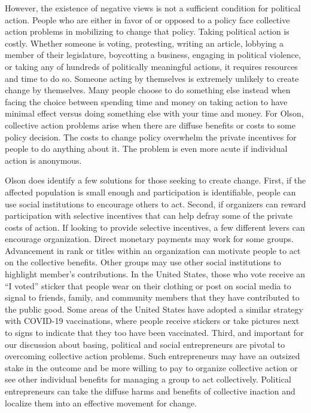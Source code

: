 However, the existence of negative views is not a sufficient condition for political action. People who are either in favor of or opposed to a policy face collective action problems in mobilizing to change that policy.\autocite{Olson1965} Taking political action is costly. Whether someone is voting, protesting, writing an article, lobbying a member of their legislature, boycotting a business, engaging in political violence, or taking any of hundreds of politically meaningful actions, it requires resources and time to do so. Someone acting by themselves is extremely unlikely to create change by themselves. Many people choose to do something else instead when facing the choice between spending time and money on taking action to have minimal effect versus doing something else with your time and money. For Olson, collective action problems arise when there are diffuse benefits or costs to some policy decision. The costs to change policy overwhelm the private incentives for people to do anything about it. The problem is even more acute if individual action is anonymous. 

Olson does identify a few solutions for those seeking to create change. First, if the affected population is small enough and participation is identifiable, people can use social institutions to encourage others to act. Second, if organizers can reward participation with selective incentives that can help defray some of the private costs of action. If looking to provide selective incentives, a few different levers can encourage organization. Direct monetary payments may work for some groups. Advancement in rank or titles within an organization can motivate people to act on the collective benefits. Other groups may use other social institutions to highlight member's contributions. In the United States, those who vote receive an ``I voted'' sticker that people wear on their clothing or post on social media to signal to friends, family, and community members that they have contributed to the public good. Some areas of the United States have adopted a similar strategy with COVID-19 vaccinations, where people receive stickers or take pictures next to signs to indicate that they too have been vaccinated. Third, and important for our discussion about basing, political and social entrepreneurs are pivotal to overcoming collective action problems. Such entrepreneurs may have an outsized stake in the outcome and be more willing to pay to organize collective action or see other individual benefits for managing a group to act collectively. Political entrepreneurs can take the diffuse harms and benefits of collective inaction and localize them into an effective movement for change.\autocite{Finnemore1998}

